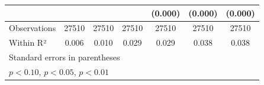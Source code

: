 \begin{table}[htbp]
\begin{tabular}{l*{6}{c}}
            &                     &                     &                     &     (0.000)         &     (0.000)         &     (0.000)         \\
\hline
Observations&       27510         &       27510         &       27510         &       27510         &       27510         &       27510         \\
Within R²   &       0.006         &       0.010         &       0.029         &       0.029         &       0.038         &       0.038         \\
\hline\hline
\multicolumn{7}{l}{\footnotesize Standard errors in parentheses}\\
\multicolumn{7}{l}{\footnotesize \sym{*} \(p<0.10\), \sym{**} \(p<0.05\), \sym{***} \(p<0.01\)}\\
\end{tabular}
\end{table}
